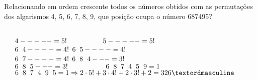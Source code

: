 \begin{ex}
 Relacionando em ordem crescente todos os números obtidos com as permutações dos algarismos 4, 5, 6, 7, 8, 9, que posição ocupa o número 687495?
  \begin{sol}  
      \phantom{A} \\  
  $\phantom{AA}4-----= 5!\hspace{1.8cm} 5----- =5!$\\
  $\phantom{AA}6\hspace{.2cm} 4 - - - - = 4!$  \hspace{1.5cm} $6\hspace{.2cm} 5 - - - - = 4!$\\
  $\phantom{AA}6\hspace{.2cm} 7 - - - - = 4!$  \hspace{1.5cm} $6\hspace{.2cm} 8\hspace{.2cm} 4  - - - = 3!$\\
  $\phantom{AA}6\hspace{.2cm}  8\hspace{.2cm}  5  - - -  = 3!  \hspace{1.9cm} 6\hspace{.2cm}  8\hspace{.2cm}  7\hspace{.2cm}  4\hspace{.2cm} 5\hspace{.2cm} 9 = 1$\\ 
  $\phantom{AA}6\hspace{.2cm}  8\hspace{.2cm}  7\hspace{.2cm}  4 \hspace{.2cm} 9 \hspace{.2cm} 5 = 1 \Rightarrow 2 \cdot 5!+3\cdot 4!+2\cdot 3!+2 = 326º$
  \end{sol}
 
\end{ex}